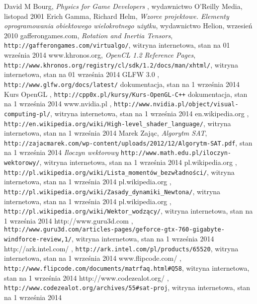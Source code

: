 \begin{thebibliography}{999}

 David M Bourg, \emph{Physics for Game Developers }, wydawnictwo O'Reilly Media, listopad 2001
 Erich Gamma, Richard Helm, \emph{Wzorce projektowe. Elementy oprogramowania obiektowego wielokrotnego użytku}, wydawnictwo Helion, wrzesień 2010
 gafferongames.com, \emph{Rotation and Inertia Tensors}, \texttt{http://gafferongames.com/virtualgo/}, witryna internetowa, stan na 01 września 2014
 www.khronos.org, \emph{OpenCL 1.2 Reference Pages},\\ \texttt{http://www.khronos.org/registry/cl/sdk/1.2/docs/man/xhtml/}, witryna internetowa, stan na 01 września 2014
 GLFW 3.0 \emph{}, \texttt{http://www.glfw.org/docs/latest/} dokumentacja, stan na 1 września 2014
 Kurs OpenGL \emph{}, \texttt{http://cpp0x.pl/kursy/Kurs-OpenGL-C++} dokumentacja, stan na 1 września 2014
 www.nvidia.pl \emph{}, \texttt{http://www.nvidia.pl/object/visual-computing-pl/}, witryna internetowa, stan na 1 września 2014
 en.wikipedia.org \emph{}, \texttt{http://en.wikipedia.org/wiki/High-level\_shader\_language/}, witryna internetowa, stan na 1 września 2014
 Marek Zając, \emph{Algorytm SAT},\\
\texttt{http://zajacmarek.com/wp-content/uploads/2012/12/Algorytm-SAT.pdf}, stan na 1 września 2014
 \emph{Iloczyn wektorowy} \texttt{http://www.math.edu.pl/iloczyn-wektorowy/}, witryna internetowa, stan na 1 września 2014
 pl.wikipedia.org \emph{}, \texttt{http://pl.wikipedia.org/wiki/Lista\_momentów\_bezwładności/}, witryna internetowa, stan na 1 września 2014
 pl.wikipedia.org \emph{}, \texttt{http://pl.wikipedia.org/wiki/Zasady\_dynamiki\_Newtona/}, witryna internetowa, stan na 1 września 2014
 pl.wikipedia.org \emph{}, \texttt{http://pl.wikipedia.org/wiki/Wektor\_wodzący/}, witryna internetowa, stan na 1 września 2014
 http://www.guru3d.com \emph{},\\
\texttt{http://www.guru3d.com/articles-pages/geforce-gtx-760-gigabyte-windforce-review,1/}, witryna internetowa, stan na 1 września 2014
 http://ark.intel.com/ \emph{}, \texttt{http://ark.intel.com/pl/products/65520}, witryna internetowa, stan na 1 września 2014
 www.flipcode.com/ \emph{}, \texttt{http://www.flipcode.com/documents/matrfaq.html\#Q58}, witryna internetowa, stan na 1 września 2014
 http://www.codezealot.org/ \emph{}, \texttt{http://www.codezealot.org/archives/55\#sat-proj}, witryna internetowa, stan na 1 września 2014
\end{thebibliography}


